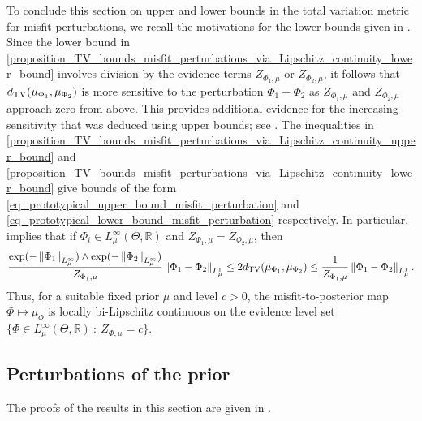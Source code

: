 \documentclass[a4paper]{scrartcl}
\theoremstyle{definition}
\numberwithin{equation}{section}
\newcommand{\R}{\mathbb{R}}
\newcommand{\Norm}[1]{\left\Vert #1 \right\Vert}
\newcommand{\TV}[0]{\textup{TV}}
\begin{document}
To conclude this section on upper and lower bounds in the total variation metric for misfit perturbations, we recall the motivations for the lower bounds given in . 
Since the lower bound in \ref{proposition_TV_bounds_misfit_perturbations_via_Lipschitz_continuity_lower_bound} involves division by the evidence terms $Z_{\Phi_1,\mu}$ or $Z_{\Phi_2,\mu}$, it follows that $d_{\TV}(\mu_{\Phi_1},\mu_{\Phi_2})$ is more sensitive to the perturbation $\Phi_1-\Phi_2$ as $Z_{\Phi_1,\mu}$ and $Z_{\Phi_2,\mu}$ approach zero from above. 
  This provides additional evidence for the increasing sensitivity that was deduced using upper bounds; see \cite[Remark 9]{Sprungk2020}.
 The inequalities in \ref{proposition_TV_bounds_misfit_perturbations_via_Lipschitz_continuity_upper_bound} and \ref{proposition_TV_bounds_misfit_perturbations_via_Lipschitz_continuity_lower_bound} give bounds of the form \eqref{eq_prototypical_upper_bound_misfit_perturbation} and \eqref{eq_prototypical_lower_bound_misfit_perturbation} respectively.
  In particular,  implies that if $\Phi_i\in L^\infty_\mu(\Theta,\R)$ and $Z_{\Phi_1,\mu}=Z_{\Phi_2,\mu}$, then
 \begin{equation*}
  \frac{\exp(-\Norm{\Phi_1}_{L^\infty_\mu})\wedge \exp(-\Norm{\Phi_2}_{L^\infty_\mu})}{Z_{\Phi_1,\mu}}\Norm{\Phi_1-\Phi_2}_{L^1_\mu} \leq 2 d_{\TV}(\mu_{\Phi_1},\mu_{\Phi_2})\leq \frac{1}{Z_{\Phi_1,\mu}}\Norm{\Phi_1-\Phi_2}_{L^1_\mu}.
 \end{equation*}
Thus, for a suitable fixed prior $\mu$ and level $c>0$, the misfit-to-posterior map $\Phi\mapsto \mu_\Phi$ is locally bi-Lipschitz continuous on the evidence level set $\{\Phi\in L^\infty_\mu(\Theta,\R)\ :\ Z_{\Phi,\mu}=c\}$.

\subsection{Perturbations of the prior}
\label{sectionTVbounds_prior_perturbation}

The proofs of the results in this section are given in .
\end{document}
